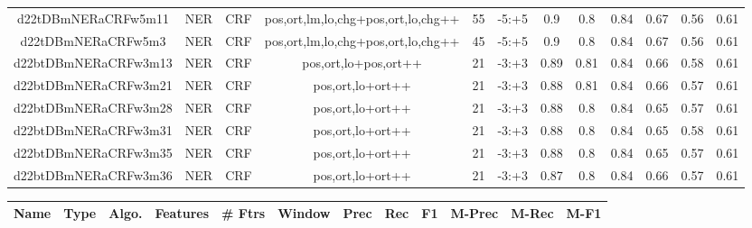\documentclass[a4paper]{article}
\begin{document}
\begin{landscape}
\begin{center}
\begin{tabular}{ |c|c|c|c|c|c|c|c|c|c|c|c|}
 
 	
 	\small{ d22tDBmNERaCRFw5m11 } & \small{ NER} & \small{  CRF }  & pos,ort,lm,lo,chg+pos,ort,lo,chg++  &  55 &  \small{  -5:+5 }  &  0.9 & 0.8 & 0.84  &  0.67 & 0.56 & 0.61 \\
 	

 
 	
 	\small{ d22tDBmNERaCRFw5m3 } & \small{ NER} & \small{  CRF }  & pos,ort,lm,lo,chg+pos,ort,lo,chg++  &  45 &  \small{  -5:+5 }  &  0.9 & 0.8 & 0.84  &  0.67 & 0.56 & 0.61 \\
 	

 
 	
 	\small{ d22btDBmNERaCRFw3m13 } & \small{ NER} & \small{  CRF }  & pos,ort,lo+pos,ort++  &  21 &  \small{  -3:+3 }  &  0.89 & 0.81 & 0.84  &  0.66 & 0.58 & 0.61 \\
 	

 
 	
 	\small{ d22btDBmNERaCRFw3m21 } & \small{ NER} & \small{  CRF }  & pos,ort,lo+ort++  &  21 &  \small{  -3:+3 }  &  0.88 & 0.81 & 0.84  &  0.66 & 0.57 & 0.61 \\
 	

 
 	
 	\small{ d22btDBmNERaCRFw3m28 } & \small{ NER} & \small{  CRF }  & pos,ort,lo+ort++  &  21 &  \small{  -3:+3 }  &  0.88 & 0.8 & 0.84  &  0.65 & 0.57 & 0.61 \\
 	

 
 	
 	\small{ d22btDBmNERaCRFw3m31 } & \small{ NER} & \small{  CRF }  & pos,ort,lo+ort++  &  21 &  \small{  -3:+3 }  &  0.88 & 0.8 & 0.84  &  0.65 & 0.58 & 0.61 \\
 	

 
 	
 	\small{ d22btDBmNERaCRFw3m35 } & \small{ NER} & \small{  CRF }  & pos,ort,lo+ort++  &  21 &  \small{  -3:+3 }  &  0.88 & 0.8 & 0.84  &  0.65 & 0.57 & 0.61 \\
 	

 
 	
 	\small{ d22btDBmNERaCRFw3m36 } & \small{ NER} & \small{  CRF }  & pos,ort,lo+ort++  &  21 &  \small{  -3:+3 }  &  0.87 & 0.8 & 0.84  &  0.66 & 0.57 & 0.61 \\
 	
 \hline
\end{tabular}
\end{center}




\begin{center}
\begin{tabular}{ |c|c|c|c|c|c|c|c|c|c|c|c|} 
 \hline
 	Name & Type & Algo. & Features & \# Ftrs & Window & Prec & Rec & F1 & M-Prec & M-Rec & M-F1\\
 \hline


\end{tabular}
\end{center}
\end{landscape}
\end{document}
